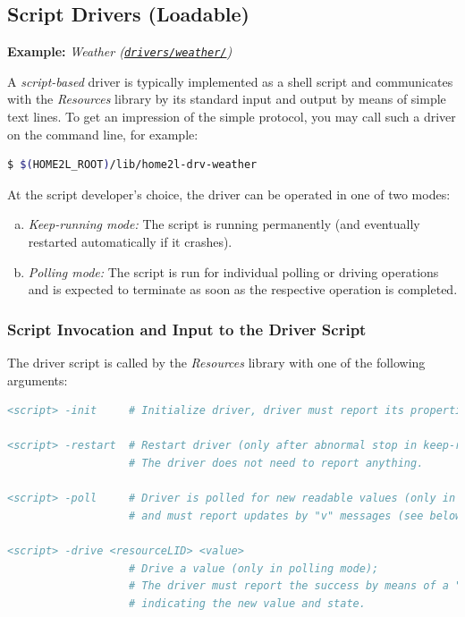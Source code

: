 \documentclass[12pt,english,parskip=half,headheight=19pt]{scrreprt}
\newcommand{\refsrc}[1]{\href{#1}{\texttt{#1}}}     %
\begin{document}
\subsection{Script Drivers (Loadable)}
\label{sec:resources-drvdev-external}


\textbf{Example:} \textit{Weather (\refsrc{drivers/weather/})}

A \textit{script-based} driver is typically implemented as a shell script
and communicates with the \textit{Resources} library by its standard input
and output by means of simple text lines. To get an impression of the
simple protocol, you may call such a driver on the command line, for example:
\begin{lstlisting}[language=bash]
  $ $(HOME2L_ROOT)/lib/home2l-drv-weather
\end{lstlisting}

At the script developer's choice, the driver can be operated in one of
two modes:

\begin{enumerate}[a)]

\item
  \textit{Keep-running mode:} The script is running permanently (and
  eventually restarted automatically if it crashes).

\item
  \textit{Polling mode:} The script is run for individual polling or driving operations and
  is expected to terminate as soon as the respective operation is completed.

\end{enumerate}


\subsubsection*{Script Invocation and Input to the Driver Script}

The driver script is called by the \textit{Resources} library with one of the following arguments:
\begin{lstlisting}[language=comments]
<script> -init     # Initialize driver, driver must report its properties (see below).

<script> -restart  # Restart driver (only after abnormal stop in keep-running mode);
                   # The driver does not need to report anything.

<script> -poll     # Driver is polled for new readable values (only in polling mode)
                   # and must report updates by "v" messages (see below).

<script> -drive <resourceLID> <value>
                   # Drive a value (only in polling mode);
                   # The driver must report the success by means of a "v" message
                   # indicating the new value and state.
\end{lstlisting}
\end{document}
